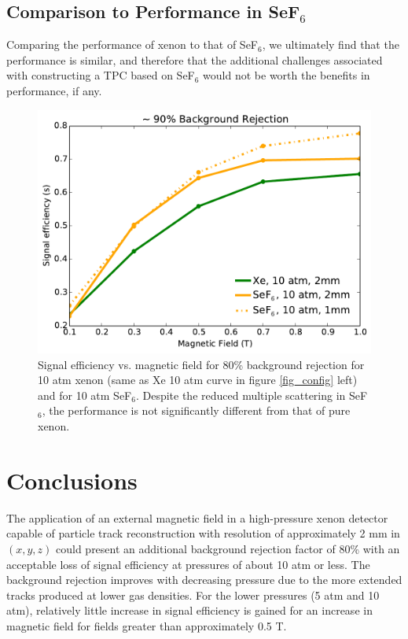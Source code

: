\documentclass{JINST}
\begin{document}
\subsection{Comparison to Performance in SeF$_6$}
Comparing the performance of xenon to that of SeF$_6$, we ultimately find that the performance is similar, and
therefore that the additional challenges associated with constructing a TPC based on SeF$_6$ would not be worth
the benefits in performance, if any.

\begin{figure}[!htb]
	\centering
	\includegraphics[scale=0.43]{fig/eff_vs_b_xe_sef6_90.pdf}
	\caption{\label{fig_xevssef6}Signal efficiency vs. magnetic field for 80\% background rejection for 10 atm xenon (same as Xe 10 atm curve in figure \protect\ref{fig_config} left) and for 10 atm SeF$_6$.  Despite the reduced multiple scattering in SeF$_6$, the performance is not significantly different from that of pure xenon.}
\end{figure}

\section{Conclusions}
The application of an external magnetic field in a high-pressure xenon detector capable of particle track reconstruction with resolution of approximately 2 mm in $(x,y,z)$ could present an additional background rejection factor of 80\% with an acceptable loss of signal efficiency at pressures of about 10 atm or less.  The background rejection improves with decreasing pressure due to the more extended tracks produced at lower gas densities.  For the lower pressures (5 atm and 10 atm), relatively little increase in signal efficiency is gained for an increase in magnetic field for fields greater than approximately 0.5 T.
\end{document}
